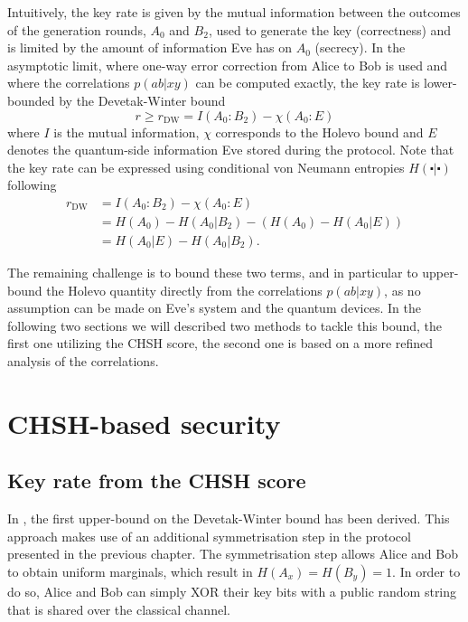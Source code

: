 Intuitively, the key rate is given by the mutual information between the outcomes of the generation rounds, $A_0$ and $B_2$, used to generate the key (correctness) and is limited by the amount of information Eve has on $A_0$ (secrecy).
In the asymptotic limit, where one-way error correction from Alice to Bob is used and where the correlations $p(ab|xy)$ can be computed exactly, the key rate is lower-bounded by the Devetak-Winter bound~\cite{Devetak2005}
\begin{equation}
	r \geq r_\mathrm{DW} = I(A_0 : B_2) - \chi(A_0 : E)
	\label{eq:Devetak-Winter}
\end{equation}
where $I$ is the mutual information, $\chi$ corresponds to the Holevo bound and $E$ denotes the quantum-side information Eve stored during the protocol.
Note that the key rate can be expressed using conditional von Neumann entropies $H(\centerdot|\centerdot)$ following
\begin{equation}
	\begin{split}
		r_\mathrm{DW} &= I(A_0 : B_2) - \chi(A_0 : E) \\
					  &= H(A_0)-H(A_0|B_2) - (H(A_0)- H(A_0|E)) \\
					  &= H(A_0|E) - H(A_0 | B_2).
	\end{split}
\end{equation}

The remaining challenge is to bound these two terms, and in particular to upper-bound the Holevo quantity directly from the correlations $p(ab|xy)$, as no assumption can be made on Eve's system and the quantum devices. 
In the following two sections we will described two methods to tackle this bound, the first one utilizing the CHSH score, the second one is based on a more refined analysis of the correlations.

\section{CHSH-based security}

\subsection{Key rate from the CHSH score}
\label{sec:pironio}

In \cite{Pironio2009}, the first upper-bound on the Devetak-Winter bound has been derived.
This approach makes use of an additional symmetrisation step in the protocol presented in the previous chapter.
The symmetrisation step allows Alice and Bob to obtain uniform marginals, which result in $H(A_x)=H(B_y)=1$.
In order to do so, Alice and Bob can simply XOR their key bits with a public random string that is shared over the classical channel.

